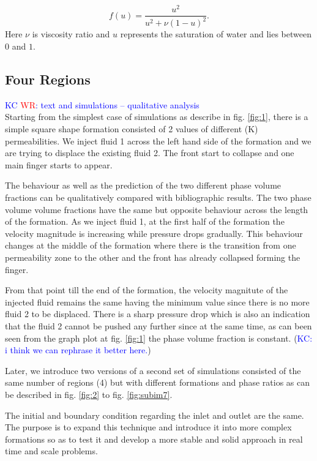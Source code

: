 \documentclass[preprint,authoryear,12pt]{elsarticle}
\begin{document}
\begin{equation}
f(u) = \frac{u^2}{u^2 + \nu(1-u)^2}. \label{buckley}
\end{equation}
Here $\nu$ is viscosity ratio and $u$ represents the saturation of water and
lies between $0$ and $1$.

\subsection{Four Regions}\label{section:4Regions}
\textcolor{blue}{KC \textcolor{red}{WR}: text and simulations -- qualitative analysis}\\

Starting from the simplest case of simulations as describe in fig. \ref{fig:1}, there is a simple square shape formation consisted of 2 values of different (K) permeabilities. We inject fluid 1 across the left hand side of the formation and we are trying to displace the existing fluid 2. The front start to collapse and one main finger starts to appear.

The behaviour as well as the prediction of the two different phase volume fractions can be qualitatively compared with bibliographic results. The two phase volume volume fractions have the same but opposite behaviour across the length of the formation. As we inject fluid 1, at the first half of the formation the velocity magnitude is increasing while pressure drops gradually. This behaviour changes at the middle of the formation where there is the transition from one permeability zone to the other and the front has already collapsed forming the finger. 

From that point till the end of the formation, the velocity magnitute of the injected fluid remains the same having the minimum value since there is no more fluid 2 to be displaced. There is a sharp pressure drop which is also an indication that the fluid 2 cannot be pushed any further since at the same time, as can been seen from the graph plot at fig. \ref{fig:1} the phase volume fraction is constant. (\textcolor{blue}{KC: i think we can rephrase it better here.}) 

Later, we introduce two versions of a second set of simulations consisted of the same number of regions (4) but with different formations and phase ratios as can be described in fig. \ref{fig:2} to fig. \ref{fig:subim7}. 

The initial and boundary condition regarding the inlet and outlet are the same. The purpose is to expand this technique and introduce it into more complex formations so as to test it and develop a more stable and solid approach in real time and scale problems. 
\end{document}
